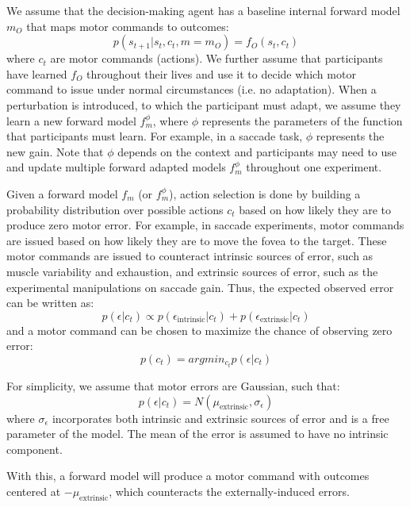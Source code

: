 \documentclass[a4paper,doc,floatsintext,natbib]{apa6}%
\begin{document}
We assume that the decision-making agent has a baseline internal forward model $m_O$ that
maps motor commands to outcomes:
\begin{equation}
p(s_{t+1} | s_t, c_t, m=m_O) = f_O(s_t, c_t)
\end{equation}
where $c_t$ are motor commands (actions). We further assume that participants
have learned $f_O$ throughout their lives and use it to decide which motor
command to issue under normal circumstances (i.e. no adaptation). When a
perturbation is introduced, to which the participant must adapt, we assume they
learn a new forward model $f_m^{\phi}$, where $\phi$ represents the parameters
of the function that participants must learn. For example, in a saccade task,
$\phi$ represents the new gain. Note that $\phi$ depends on the context and
participants may need to use and update multiple forward adapted models
$f_m^{\phi}$ throughout one experiment.

Given a forward model $f_m$ (or $f_m^\phi$), action selection is done by
building a probability distribution over possible actions $c_t$ based on how
likely they are to produce zero motor error. For example, in saccade
experiments, motor commands are issued based on how likely they are to move the
fovea to the target. These motor commands are issued to counteract intrinsic
sources of error, such as muscle variability and exhaustion, and extrinsic
sources of error, such as the experimental manipulations on saccade gain. Thus,
the expected observed error can be written as:
\begin{equation}
p(\epsilon | c_t) \propto p(\epsilon_{\text{intrinsic}} | c_t) + p(\epsilon_{\text{extrinsic}} | c_t)
\end{equation}
and a motor command can be chosen to maximize the chance of observing zero error:
\begin{equation}
p(c_t) = argmin_{c_t} p(\epsilon | c_t)
\end{equation}

For simplicity, we assume that motor errors are Gaussian, such that:
\begin{equation}
p(\epsilon | c_t) = N(\mu_{\text{extrinsic}}, \sigma_\epsilon)
\end{equation}
where $\sigma_\epsilon$ incorporates both intrinsic and extrinsic sources of
error and is a free parameter of the model. The mean of the error is assumed to
have no intrinsic component.

With this, a forward model will produce a motor command with outcomes centered
at $-\mu_{\text{extrinsic}}$, which counteracts the externally-induced errors.
\end{document}
